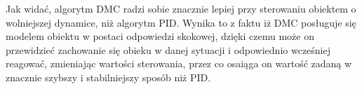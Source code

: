\begin{figure}

	\centering
	\caption{ }
	
		\label{w6}
\end{figure}

\begin{figure}

	\centering
	\caption{ }
	
		\label{w7}
\end{figure}

\FloatBarrier
Jak widać, algorytm DMC radzi sobie znacznie lepiej przy sterowaniu obiektem o wolniejszej dynamice, niż algorytm PID. Wynika to z faktu iż DMC posługuje się modelem obiektu w postaci odpowiedzi skokowej, dzięki czemu może on przewidzieć zachowanie się obieku w danej sytuacji i odpowiednio wcześniej reagować, zmieniając wartości sterowania, przez co osaiąga on wartość zadaną w znacznie szybszy i stabilniejszy sposób niż PID.
